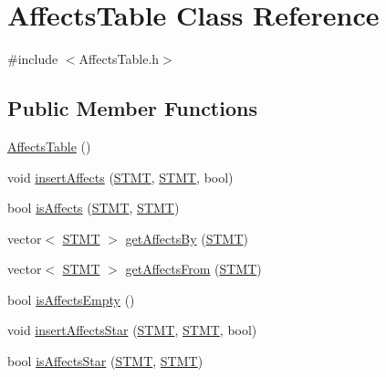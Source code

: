 \hypertarget{class_affects_table}{\section{Affects\-Table Class Reference}
\label{class_affects_table}
}


{\ttfamily \#include $<$Affects\-Table.\-h$>$}

\subsection*{Public Member Functions}
\begin{DoxyCompactItemize}
\item 
\hyperlink{class_affects_table_a771180b48d4fb5ddfefa2c9aef18eba2}{Affects\-Table} ()
\item 
void \hyperlink{class_affects_table_a86cf05d4f8244a30401bcdba36a46654}{insert\-Affects} (\hyperlink{std_afx_8h_a4a876b28ac3f59cecb39c2d2d76e4e7a}{S\-T\-M\-T}, \hyperlink{std_afx_8h_a4a876b28ac3f59cecb39c2d2d76e4e7a}{S\-T\-M\-T}, bool)
\item 
bool \hyperlink{class_affects_table_a3eaa0d0d2edbb13408ffa9b3597e0599}{is\-Affects} (\hyperlink{std_afx_8h_a4a876b28ac3f59cecb39c2d2d76e4e7a}{S\-T\-M\-T}, \hyperlink{std_afx_8h_a4a876b28ac3f59cecb39c2d2d76e4e7a}{S\-T\-M\-T})
\item 
vector$<$ \hyperlink{std_afx_8h_a4a876b28ac3f59cecb39c2d2d76e4e7a}{S\-T\-M\-T} $>$ \hyperlink{class_affects_table_a3a0ede4d68bfb47df2d5c470305916e0}{get\-Affects\-By} (\hyperlink{std_afx_8h_a4a876b28ac3f59cecb39c2d2d76e4e7a}{S\-T\-M\-T})
\item 
vector$<$ \hyperlink{std_afx_8h_a4a876b28ac3f59cecb39c2d2d76e4e7a}{S\-T\-M\-T} $>$ \hyperlink{class_affects_table_a44d4a968c8dcf7d5e0e726636b5e4f42}{get\-Affects\-From} (\hyperlink{std_afx_8h_a4a876b28ac3f59cecb39c2d2d76e4e7a}{S\-T\-M\-T})
\item 
bool \hyperlink{class_affects_table_a5e55a8bba28aa0b034231ec37ccfe600}{is\-Affects\-Empty} ()
\item 
void \hyperlink{class_affects_table_a193a0b59a79c7a5aa855e8d722e6fad6}{insert\-Affects\-Star} (\hyperlink{std_afx_8h_a4a876b28ac3f59cecb39c2d2d76e4e7a}{S\-T\-M\-T}, \hyperlink{std_afx_8h_a4a876b28ac3f59cecb39c2d2d76e4e7a}{S\-T\-M\-T}, bool)
\item 
bool \hyperlink{class_affects_table_a6343a81b3fa5327456337045e8e6ab0d}{is\-Affects\-Star} (\hyperlink{std_afx_8h_a4a876b28ac3f59cecb39c2d2d76e4e7a}{S\-T\-M\-T}, \hyperlink{std_afx_8h_a4a876b28ac3f59cecb39c2d2d76e4e7a}{S\-T\-M\-T})

\end{DoxyCompactItemize}

